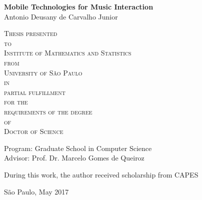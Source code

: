 \documentclass[11pt,twoside,a4paper]{book}
\begin{document}
	
	\thispagestyle{empty}
	\begin{center}
		\vspace*{2.3cm}
		\textbf{\Large{Mobile Technologies for Music Interaction}}\\
		
		\vspace*{1.2cm}
		\Large{Antonio Deusany de Carvalho Junior}
		
		\vskip 2cm
		 
		\textsc{
			Thesis presented\\[-0.25cm] 
			to\\[-0.25cm]
			Institute of Mathematics and Statistics\\[-0.25cm]
			from\\[-0.25cm]
			University of São Paulo\\[-0.25cm]
            in\\[-0.25cm]
            partial fulfillment\\[-0.25cm]
			for the\\[-0.25cm]
			requirements of the degree\\[-0.25cm]
			of\\[-0.25cm]
			Doctor of Science}
		
		\vskip 1.5cm
		Program: Graduate School in Computer Science\\
		Advisor: Prof. Dr. Marcelo Gomes de Queiroz
		
		\vskip 1cm
		\normalsize{During this work, the author received scholarship from CAPES}
		
		\vskip 0.5cm
		\normalsize{São Paulo, May 2017}
	\end{center}
	
	
	
\end{document}
